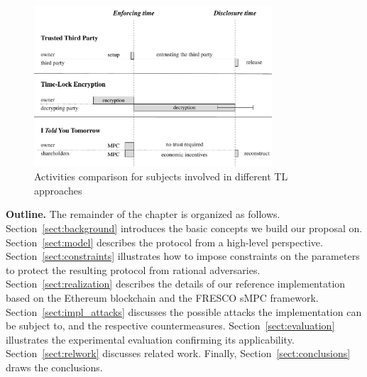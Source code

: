 \begin{figure}[t]
	\centering
	\includegraphics[height=170pt]{fig/models}
	\caption{Activities comparison for subjects involved in different TL approaches}
	\label{fig:models}
\end{figure}


\medskip\textbf{Outline.} The remainder of the chapter is organized as follows.
%
Section~\ref{sect:background} introduces the basic concepts we build our proposal on. 
%
Section~\ref{sect:model} describes the \shortname protocol from a high-level perspective.
%
Section~\ref{sect:constraints} illustrates how to impose constraints on the parameters to protect the resulting protocol from rational adversaries.
%
%
Section~\ref{sect:realization} describes the details of our reference implementation based on the Ethereum blockchain and the FRESCO sMPC framework.
%
Section~\ref{sect:impl_attacks} discusses the possible attacks the implementation can be subject to, and the respective countermeasures.
%
Section~\ref{sect:evaluation} illustrates the experimental evaluation confirming its applicability.
%
Section~\ref{sect:relwork} discusses related work.
%
Finally, Section~\ref{sect:conclusions} draws the conclusions.
